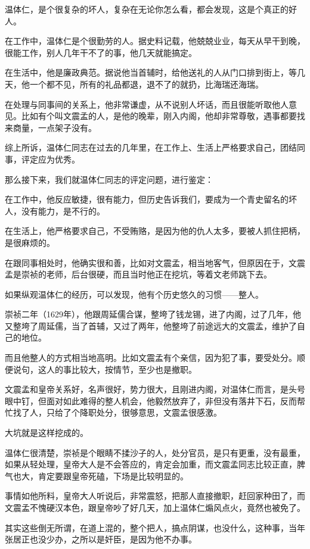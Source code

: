 \begin{multicols}{\theparacolNo}
温体仁，是个很复杂的坏人，复杂在无论你怎么看，都会发现，这是个真正的好人。

在工作中，温体仁是个很勤劳的人。据史料记载，他兢兢业业，每天从早干到晚，很能工作，别人几年干不了的事，他几天就能搞定。

在生活中，他是廉政典范。据说他当首辅时，给他送礼的人从门口排到街上，等几天，他一个都不见，所有的礼品都退，退不了的就扔，比海瑞还海瑞。

在处理与同事间的关系上，他非常谦虚，从不说别人坏话，而且很能听取他人意见。比如有个叫文震孟的人，是他的晚辈，刚入内阁，他却非常尊敬，遇事都要找来商量，一点架子没有。

综上所诉，温体仁同志在过去的几年里，在工作上、生活上严格要求自己，团结同事，评定应为优秀。

那么接下来，我们就温体仁同志的评定问题，进行鉴定：

在工作中，他反应敏捷，很有能力，但历史告诉我们，要成为一个青史留名的坏人，没有能力，是不行的。

在生活上，他严格要求自己，不受贿赂，是因为他的仇人太多，要被人抓住把柄，是很麻烦的。

在跟同事相处时，他确实很和善，比如对文震孟，相当地客气，但原因在于，文震孟是崇祯的老师，后台很硬，而且当时他正在挖坑，等着文老师跳下去。

如果纵观温体仁的经历，可以发现，他有个历史悠久的习惯——整人。

崇祯二年（1629年），他跟周延儒合谋，整垮了钱龙锡，进了内阁，过了几年，他又整垮了周延儒，当了首辅，又过了两年，他整垮了前途远大的文震孟，维护了自己的地位。

而且他整人的方式相当地高明。比如文震孟有个亲信，因为犯了事，要受处分。顺便说句，这人的事比较大，按情节，至少也是撤职。

文震孟和皇帝关系好，名声很好，势力很大，且刚进内阁，对温体仁而言，是头号眼中钉，但面对如此难得的整人机会，他毅然放弃了，非但没有落井下石，反而帮忙找了人，只给了个降职处分，很够意思，文震孟很感激。

大坑就是这样挖成的。

温体仁很清楚，崇祯是个眼睛不揉沙子的人，处分官员，是只有更重，没有最重，如果从轻处理，皇帝大人是不会答应的，肯定会加重，而文震孟同志比较正直，脾气也大，肯定要跟皇帝死磕，下场是比较明显的。

事情如他所料，皇帝大人听说后，非常震怒，把那人直接撤职，赶回家种田了，而文震孟不愧硬汉本色，跟皇帝吵了好几天，加上温体仁煽风点火，竟然也被免了。

其实这些倒无所谓，在道上混的，整个把人，搞点阴谋，也没什么，这种事，当年张居正也没少办，之所以是奸臣，是因为他不办事。


\end{multicols}
